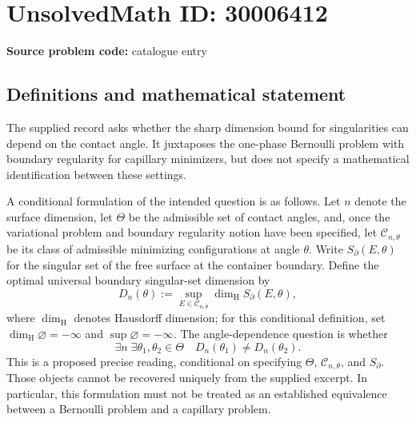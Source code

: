 \documentclass[11pt]{article}
\begin{document}
\section*{UnsolvedMath ID: 30006412}
\textbf{Source problem code:} catalogue entry
\subsection{Definitions and mathematical statement}
The supplied record asks whether the sharp dimension bound for singularities can depend on the contact angle. It juxtaposes the one-phase Bernoulli problem with boundary regularity for capillary minimizers, but does not specify a mathematical identification between these settings.

A conditional formulation of the intended question is as follows. Let \(n\) denote the surface dimension, let \(\Theta\) be the admissible set of contact angles, and, once the variational problem and boundary regularity notion have been specified, let \(\mathcal C_{n,\theta}\) be its class of admissible minimizing configurations at angle \(\theta\). Write \(S_{\partial}(E,\theta)\) for the singular set of the free surface at the container boundary. Define the optimal universal boundary singular-set dimension by
\[
D_n(\theta):=\sup_{E\in\mathcal C_{n,\theta}}\dim_{\mathrm H}S_{\partial}(E,\theta),
\]
where \(\dim_{\mathrm H}\) denotes Hausdorff dimension; for this conditional definition, set \(\dim_{\mathrm H}\varnothing=-\infty\) and \(\sup\varnothing=-\infty\). The angle-dependence question is whether
\[
\exists n\;\exists\theta_1,\theta_2\in\Theta
\quad D_n(\theta_1)\ne D_n(\theta_2).
\]
This is a proposed precise reading, conditional on specifying \(\Theta\), \(\mathcal C_{n,\theta}\), and \(S_{\partial}\). Those objects cannot be recovered uniquely from the supplied excerpt. In particular, this formulation must not be treated as an established equivalence between a Bernoulli problem and a capillary problem.
\end{document}

